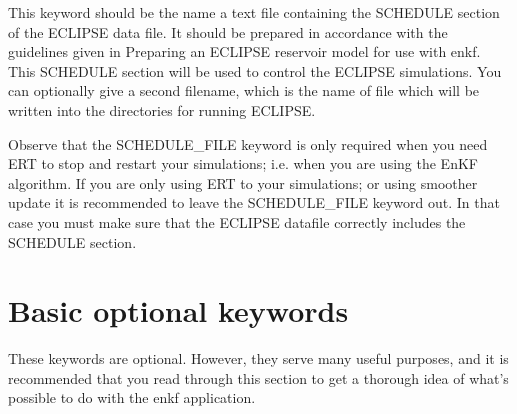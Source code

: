 \documentclass[letterpaper,10pt,english]{sphinxmanual}
\begin{document}
\begin{sphinxShadowBox}

This keyword should be the name a text file containing the SCHEDULE section of
the ECLIPSE data file. It should be prepared in accordance with the guidelines
given in Preparing an ECLIPSE reservoir model for use with enkf. This SCHEDULE
section will be used to control the ECLIPSE simulations. You can optionally
give a second filename, which is the name of file which will be written into
the directories for running ECLIPSE.


%
\begin{sphinxVerbatim}[commandchars=\\\{\}]
       
  
\end{sphinxVerbatim}

Observe that the SCHEDULE\_FILE keyword is only required when you need ERT to
stop and restart your simulations; i.e. when you are using the EnKF algorithm.
If you are only using ERT to your simulations; or using smoother update it is
recommended to leave the SCHEDULE\_FILE keyword out. In that case you must make
sure that the ECLIPSE datafile correctly includes the SCHEDULE section.
\end{sphinxShadowBox}


\section{Basic optional keywords}
\label{\detokenize{keywords/index:basic-optional-keywords}}\label{\detokenize{keywords/index:id2}}
These keywords are optional. However, they serve many useful purposes, and it is
recommended that you read through this section to get a thorough idea of what’s
possible to do with the enkf application.
\end{document}
